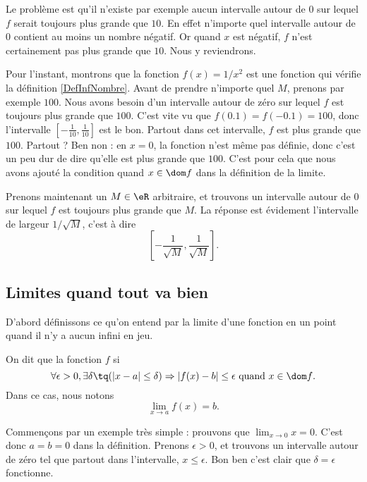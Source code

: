 Le problème est qu'il n'existe par exemple aucun intervalle autour de $0$ sur lequel $f$ serait toujours plus grande que $10$. En effet n'importe quel intervalle autour de $0$ contient au moins un nombre négatif. Or quand $x$ est négatif, $f$ n'est certainement pas plus grande que $10$. Nous y reviendrons.

Pour l'instant, montrons que la fonction $f(x)=1/x^2$ est une fonction qui vérifie la définition \ref{DefInfNombre}.  Avant de prendre n'importe quel $M$, prenons par exemple $100$. Nous avons besoin d'un intervalle autour de zéro sur lequel $f$ est toujours plus grande que $100$. C'est vite vu que $f(0.1)=f(-0.1)=100$, donc l'intervalle $[-\frac{ 1 }{ 10 },\frac{1}{ 10 }]$ est le bon. Partout dans cet intervalle, $f$ est plus grande que $100$. Partout ? Ben non : en $x=0$, la fonction n'est même pas définie, donc c'est un peu dur de dire qu'elle est plus grande que $100$. C'est pour cela que nous avons ajouté la condition \og quand $x\in\dom f$\fg{} dans la définition de la limite.

Prenons maintenant un $M\in\eR$ arbitraire, et trouvons un intervalle autour de $0$ sur lequel $f$ est toujours plus grande que $M$. La réponse est évidement l'intervalle de largeur $1/\sqrt{M}$, c'est à dire 
\[ 
  \left[ -\frac{ 1 }{ \sqrt{M} },\frac{ 1 }{ \sqrt{M} } \right].
\]

\subsection{Limites quand tout va bien}

D'abord définissons ce qu'on entend par la limite d'une fonction en un point quand il n'y a aucun infini en jeu.
\begin{definition}      \label{DefLimPointSansInfini}
 On dit que la fonction $f$  si 
\[ 
  \forall \epsilon>0,\exists\delta\tq (| x-a |\leq\delta)\Rightarrow | f(x)-b |\leq \epsilon\text{ quand $x\in\dom f$}.
\]
Dans ce cas, nous notons
\begin{equation}
\lim_{x\to a}f(x)=b.
\end{equation} 
\end{definition}

Commençons par un exemple très simple : prouvons que $\lim_{x\to 0}x=0$. C'est donc $a=b=0$ dans la définition. Prenons $\epsilon>0$, et trouvons un intervalle autour de zéro tel que partout dans l'intervalle, $x\leq \epsilon$. Bon ben c'est clair que $\delta=\epsilon$ fonctionne.

